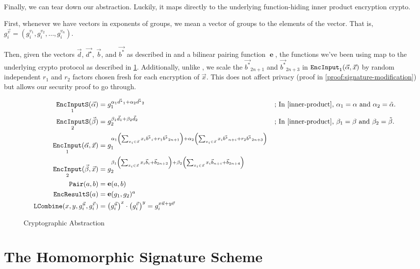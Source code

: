 \documentclass[pdftex,12pt,a4papaer,twoside,notitlepage]{report}
\DeclareMathOperator{\e}{\mathbf{e}}
\DeclareMathOperator{\ein}{\mathtt{EncInput}}
\DeclareMathOperator{\combine}{\mathtt{LCombine}}
\DeclareMathOperator{\eins}{\mathtt{EncInputS}}
\DeclareMathOperator{\eouts}{\mathtt{EncResultS}}
\DeclareMathOperator{\pair}{\mathtt{Pair}}
\begin{document}
Finally, we can tear down our abstraction. Luckily, it maps directly to the
underlying function-hiding inner product encryption crypto.

First, whenever we have vectors in exponents of groups, we mean a vector of
groups to the elements of the vector. That is, $g_i^{\vec{v}} = (g_i^{v_1},
g_i^{v_2}, \ldots, g_i^{v_n})$.

Then, given the vectors $\vec{d}$, $\vec{d^\star}$, $\vec{b}$, and $\vec{b^*}$
as described in \cite{inner-product} and a bilinear pairing function $\e$, the
functions we've been using map to the underlying crypto protocol as described in
\cref{fig:abstraction}. Additionally, unlike \cite{inner-product}, we scale the
$\vec{b^*}_{2n+1}$ and $\vec{b^*}_{2n+3}$ in $\ein_1(\Ap, \vec{x})$ by random
independent $r_1$ and $r_2$ factors chosen fresh for each encryption of
$\vec{x}$. This does not affect privacy (proof in
\cref{proof:signature-modification}) but allows our security proof to go
through.

\begin{figure}[H]
\label{fig:abstraction}
\begin{align*}
  \eins_1(\Ap) &= g_1^{\alpha_1\vec{d^*}_1 + \alpha_2\vec{d^*}_2} && \text{; In \cite{inner-product}, $\alpha_1 = \alpha$ and $\alpha_2 = \tilde{\alpha}$.} \\
  \eins_2(\Bp) &= g_2^{\beta_1\vec{d}_1 + \beta_2\vec{d}_2} && \text{; In \cite{inner-product}, $\beta_1 = \beta$ and $\beta_2 = \tilde{\beta}$.} \\
  \ein_1(\Ap, \vec{x}) &= g_1^{\alpha_1\left(\sum_{x_i \in \vec{x}}{x_i\vec{b^*}_i} + r_1\vec{b^*}_{2n+1}\right) + \alpha_2\left(\sum_{x_i \in \vec{x}}{x_i\vec{b^*}_{n+i}} + r_2\vec{b^*}_{2n+3}\right)} \\
  \ein_2(\Bp, \vec{x}) &= g_2^{\beta_1\left(\sum_{x_i \in \vec{x}}{x_i\vec{b}_i} + \vec{b}_{2n+2}\right) + \beta_2\left(\sum_{x_i \in \vec{x}}{x_i\vec{b}_{n+i}} + \vec{b}_{2n+4}\right)} \\
  \pair(a, b) &= \e(a, b) \\
  \eouts(a) &= \e(g_1, g_2)^a \\
  \combine(x, y, g_i^{\vec{u}}, g_i^{\vec{v}}) &= \left(g_i^{\vec{u}}\right)^x \cdot \left(g_i^{\vec{v}}\right)^y = g_i^{x\vec{u} + y\vec{v}}
\end{align*}
\caption{Cryptographic Abstraction}
\end{figure}

\section{The Homomorphic Signature Scheme}
\label{sec:homo-sig}
\end{document}
